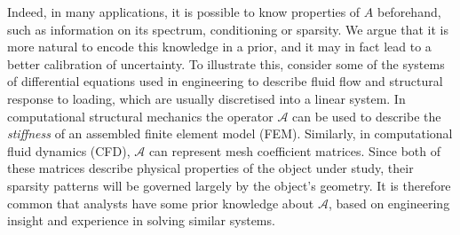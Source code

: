 \documentclass[twoside]{article}
\begin{document}
		Indeed, in many applications, it is possible to know properties of $A$ beforehand, such as information on its spectrum, conditioning or sparsity. We argue that it is more natural to encode this knowledge in a prior, and it may in fact lead to a better calibration of uncertainty. To illustrate this, consider some of the systems of differential equations used in engineering to describe fluid flow and structural response to loading, which are usually discretised into a linear system.
		In computational structural mechanics the operator $\mathcal{A}$ can be used to describe the \textit{stiffness} of an assembled finite element model (FEM). Similarly, in computational fluid dynamics (CFD), $\mathcal{A}$ can represent mesh coefficient matrices. Since both of these matrices describe physical properties of the object under study, their sparsity patterns will be governed largely by the object's geometry. It is therefore common that analysts have some prior knowledge about $\mathcal{A}$, based on engineering insight and experience in solving similar systems.
		
\end{document}
